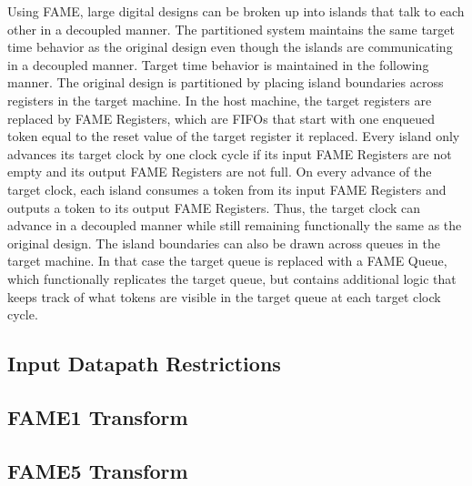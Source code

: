Using FAME, large digital designs can be broken up into islands that talk to each other in a decoupled manner. The partitioned system maintains the same target time behavior as the original design even though the islands are communicating in a decoupled manner. Target time behavior is maintained in the following manner. The original design is partitioned by placing island boundaries across registers in the target machine. In the host machine, the target registers are replaced by FAME Registers, which are FIFOs that start with one enqueued token equal to the reset value of the target register it replaced. Every island only advances its target clock by one clock cycle if its input FAME Registers are not empty and its output FAME Registers are not full. On every advance of the target clock, each island consumes a token from its input FAME Registers and outputs a token to its output FAME Registers. Thus, the target clock can advance in a decoupled manner while still remaining functionally the same as the original design. The island boundaries can also be drawn across queues in the target machine. In that case the target queue is replaced with a FAME Queue, which functionally replicates the target queue, but contains additional logic that keeps track of what tokens are visible in the target queue at each target clock cycle.

\subsection{Input Datapath Restrictions}
\subsection{FAME1 Transform}
\subsection{FAME5 Transform}
